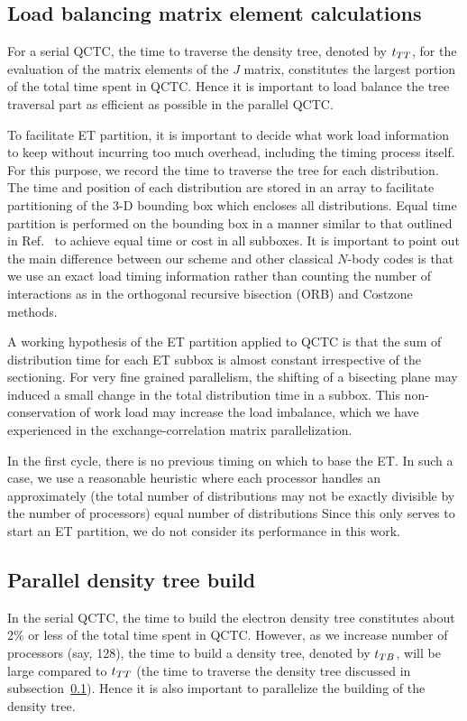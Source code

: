 \commentoutA{\documentclass[prl,aps,twocolumn,twocolumngrid,superbib]{revtex4}}
\begin{document}
\subsection{Load balancing matrix element calculations}
\label{ETPartition}
For a serial QCTC, the time to traverse the density tree, denoted by
$t_{TT}$, for the evaluation of the matrix elements of the $J$ matrix,
constitutes the largest portion of the total time spent in QCTC.
Hence it is important to load balance the tree traversal part as
efficient as possible in the parallel QCTC.


To facilitate ET partition, it is important to decide what work load
information to keep without incurring too much overhead, including the
timing process itself.  For this purpose, we record the time to
traverse the tree for each distribution. The time and position of each
distribution are stored in an array to facilitate partitioning of the
3-D bounding box which encloses all distributions. Equal time
partition is performed on the bounding box in a manner similar to that
outlined in Ref.~ to achieve equal time or cost in
all subboxes.  It is important to point out the main difference
between our scheme and other classical $N$-body
codes\cite{MWarren92,Singh93} is that we use an exact load timing
information rather than counting the number of interactions as in the
orthogonal recursive bisection (ORB)\cite{MWarren92} and Costzone
methods\cite{Singh93}.

A working hypothesis of the ET partition applied to QCTC is that the
sum of distribution time for each ET subbox is almost constant
irrespective of the sectioning. For very fine grained parallelism, the
shifting of a bisecting plane may induced a small change in the total
distribution time in a subbox.  This non-conservation of work load may
increase the load imbalance, which we have experienced in the
exchange-correlation matrix parallelization\cite{CGan03}.

In the first cycle, there is no previous timing on which to base the
ET. In such a case, we use a reasonable heuristic where each processor
handles an approximately (the total number of distributions may not be
exactly divisible by the number of processors) equal number of
distributions Since this only serves to start an ET partition, we do
not consider its performance in this work.

\subsection{Parallel density tree build} 
\label{sec:parallelTB}
In the serial QCTC, the time to build the electron density tree
constitutes about 2\% or less of the total time spent in
QCTC. However, as we increase number of processors (say, 128), the
time to build a density tree, denoted by $t_{TB}$, will be large
compared to $t_{TT}$ (the time to traverse the density tree discussed in
subsection~\ref{ETPartition}).  Hence it is also important to
parallelize the building of the density tree.
\end{document}
